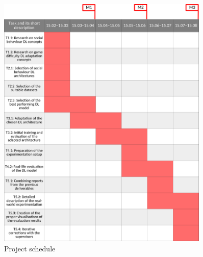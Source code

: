 \documentclass[thesis]{mas_proposal}
\begin{document}
\begin{figure}[h!]
	\includegraphics[width=0.9\textwidth]{images/plan/plan.png}
	\caption{Project schedule}
	\label{fig:gantt}
\end{figure}

\clearpage

\end{document}
